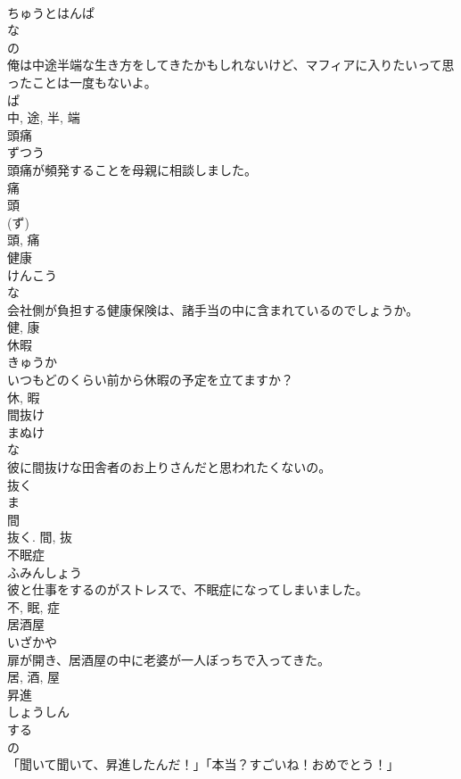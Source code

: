 \documentclass[8pt]{extreport}
\begin{document}
\begin{CJK}{UTF8}{min}
\\	ちゅうとはんぱ	
\\	な 
\\	の 
\\	俺は中途半端な生き方をしてきたかもしれないけど、マフィアに入りたいって思ったことは一度もないよ。	
\\	ぱ 
\\	中, 途, 半, 端	
\\	頭痛	
\\	ずつう	
\\	頭痛が頻発することを母親に相談しました。	
\\	痛 
\\	頭 
\\	(ず) 
\\	頭, 痛	
\\	健康	
\\	けんこう	
\\	な 
\\	会社側が負担する健康保険は、諸手当の中に含まれているのでしょうか。	
\\	健, 康	
\\	休暇	
\\	きゅうか	
\\	いつもどのくらい前から休暇の予定を立てますか？	
\\	休, 暇	
\\	間抜け	
\\	まぬけ	
\\	な 
\\	彼に間抜けな田舎者のお上りさんだと思われたくないの。	
\\	抜く 
\\	ま 
\\	間 
\\	抜く.	間, 抜	
\\	不眠症	
\\	ふみんしょう	
\\	彼と仕事をするのがストレスで、不眠症になってしまいました。	
\\	不, 眠, 症	
\\	居酒屋	
\\	いざかや	
\\	扉が開き、居酒屋の中に老婆が一人ぼっちで入ってきた。	
\\	居, 酒, 屋	
\\	昇進	
\\	しょうしん	
\\	する 
\\	の 
\\	「聞いて聞いて、昇進したんだ！」「本当？すごいね！おめでとう！」	

\end{CJK}
\end{document}

